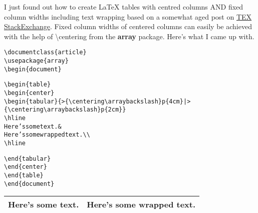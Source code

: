 \documentclass[a4paper]{article}\usepackage[]{graphicx}\usepackage[]{color}
\makeatletter
\newenvironment{kframe}{%
 \def\at@end@of@kframe{}%
 \ifinner\ifhmode%
  \def\at@end@of@kframe{\end{minipage}}%
  \begin{minipage}{\columnwidth}%
 \fi\fi%
 \def\FrameCommand##1{\hskip\@totalleftmargin \hskip-\fboxsep
 \colorbox{shadecolor}{##1}\hskip-\fboxsep
     \hskip-\linewidth \hskip-\@totalleftmargin \hskip\columnwidth}%
 \MakeFramed {\advance\hsize-\width
   \@totalleftmargin\z@ \linewidth\hsize
   \@setminipage}}%
 {\par\unskip\endMakeFramed%
 \at@end@of@kframe}
\newenvironment{knitrout}{}{} %
\makeatother
\begin{document}
I just found out how to create LaTeX tables with centred columns AND fixed column widths including text wrapping based on a somewhat aged post on \href{https://tex.stackexchange.com/questions/5017/center-column-with-specifying-width-in-table-tabular-enviroment}{TEX StackExchange}. Fixed column widths of centered columns can easily be achieved with the help of \textbackslash{centering} from the \textbf{array} package. Here's what I came up with.

\begin{knitrout}
\color{fgcolor}\begin{kframe}
\begin{alltt}
\textbackslash{}documentclass\{article\}
\textbackslash{}usepackage\{array\}
\textbackslash{}begin\{document\}

\textbackslash{}begin\{table\}
\textbackslash{}begin\{center\}
\textbackslash{}begin\{tabular\}\{>\{\textbackslash{}centering\textbackslash{}arraybackslash\}p\{4cm\} | >\{\textbackslash{}centering\textbackslash{}arraybackslash\}p\{2cm\}\}
\textbackslash{}hline
Here's some text. &
Here's some wrapped text. \textbackslash{}\textbackslash{}
\textbackslash{}hline

\textbackslash{}end\{tabular\}
\textbackslash{}end\{center\}
\textbackslash{}end\{table\}
\textbackslash{}end\{document\}
\end{alltt}
\end{kframe}
\end{knitrout}

\begin{table}[!htbp]
\begin{center}
\begin{tabular}{>{\centering\arraybackslash}p{4cm} | >{\centering\arraybackslash}p{2cm}}
\hline
Here's some text. &
Here's some wrapped text. \\
\hline

\end{tabular}
\end{center}
\end{table}
\end{document}
